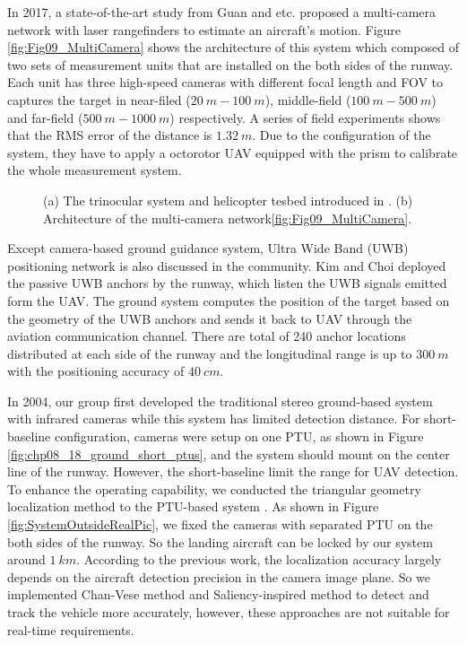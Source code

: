 \documentclass[journal,article,submit,moreauthors,pdftex,10pt,a4paper]{mdpi}
\begin{document}
In 2017, a state-of-the-art study from Guan and etc. \cite{guan2017multi} proposed a multi-camera network with laser rangefinders to estimate an aircraft's motion. Figure \ref{fig:Fig09_MultiCamera} shows the architecture of this system which composed of two sets of measurement units that are installed on the both sides of the runway. Each unit has three high-speed cameras with different focal length and FOV to captures the target in near-filed ($20\ m-100\ m$), middle-field ($100\ m-500\ m$) and far-field ($500\ m-1000\ m$) respectively. A series of field experiments shows that the RMS error of the distance is $1.32\ m$. Due to the configuration of the system, they have to apply a octorotor UAV equipped with the prism to calibrate the whole measurement system.

\begin{figure}[!tb]
	\centering
	\caption{(a) The trinocular system and helicopter tesbed introduced in \cite{Martinez2009a}. (b) Architecture of the multi-camera network\ref{fig:Fig09_MultiCamera}.}
\end{figure}

Except camera-based ground guidance system, Ultra Wide Band (UWB) positioning network is also discussed in the community. Kim and Choi \cite{kim2016uwb} deployed the passive UWB anchors by the runway, which listen the UWB signals emitted form the UAV. The ground system computes the position of the target based on the geometry of the UWB anchors and sends it back to UAV through the aviation communication channel. There are total of 240 anchor locations distributed at each side of the runway and the longitudinal range is up to $300\ m$ with the positioning accuracy of $40\ cm$.


In 2004, our group first developed the traditional stereo ground-based system with infrared cameras \cite{kong2013autonomous} while this system has limited detection distance. For short-baseline configuration, cameras were setup on one PTU, as shown in Figure  \ref{fig:chp08_18_ground_short_ptus}, and the system should mount on the center line of the runway. However, the short-baseline limit the range for UAV detection. To enhance the operating capability, we conducted the triangular geometry localization method to the PTU-based system \cite{kong2014ground}. As shown in Figure \ref{fig:SystemOutsideRealPic}, we fixed the cameras with separated PTU on the both sides of the runway. So the landing aircraft can be locked by our system around $1\ km$. According to the previous work, the localization accuracy largely depends on the aircraft detection precision in the camera image plane. So we implemented Chan-Vese method \cite{tang2016ground} and Saliency-inspired method \cite{ma2016stereo} to detect and track the vehicle more accurately, however, these approaches are not suitable for real-time requirements.
\end{document}
